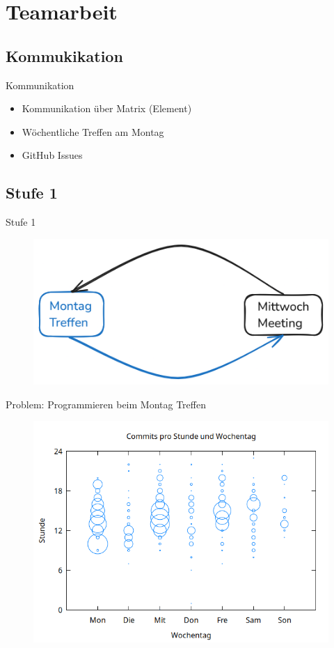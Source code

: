 \section{Teamarbeit}

\subsection{Kommukikation}
\begin{frame}{Kommunikation}
    \begin{itemize}
        \item Kommunikation über Matrix (Element)
        \item Wöchentliche Treffen am Montag
        \item GitHub Issues
    \end{itemize}
\end{frame}

\subsection{Stufe 1}
\begin{frame}{Stufe 1}
    \begin{figure}
        \centering
        \includegraphics[width=0.6\linewidth]{pictures/level1}
        \label{fig:lvl1}
    \end{figure}
\end{frame}

\begin{frame}{Problem: Programmieren beim Montag Treffen}
\begin{figure}
    \centering
    \includegraphics[width=0.52\linewidth]{pictures/hours}
    \label{fig:commit-hours}
\end{figure}
\end{frame}

